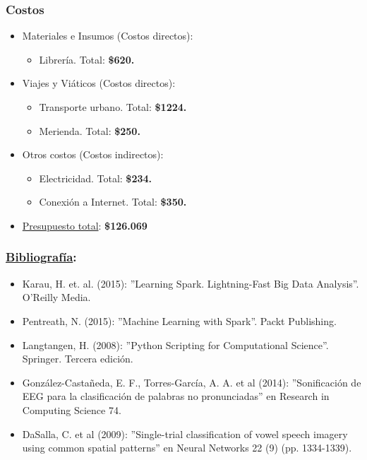 \begin{frame}[t,fragile]
	\frametitle {Costos}
	
		\begin{itemize}
			\item Materiales e Insumos (Costos directos):
			\begin{itemize}
				\item Librer\'ia. Total: \textbf{\$620.} 
			\end{itemize}
			\pause
			\item Viajes y Vi\'aticos (Costos directos): 
			\begin{itemize}
				\item Transporte urbano. Total: \textbf{\$1224.}
				\item Merienda. Total: \textbf{\$250.}
			\end{itemize}
			\pause
			\item Otros costos (Costos indirectos): 
			\begin{itemize}
				\item Electricidad. Total: \textbf{\$234.}
				\item Conexi\'on a Internet. Total: \textbf{\$350.}
			\end{itemize}
			\pause
			\item \underline{Presupuesto total}: \textbf{\color{blue}\$126.069}
		\end{itemize}
		
	
\end{frame}
	
\begin{frame}
	\frametitle{\underline{Bibliograf\'ia}:}
	\begin{itemize}
		\item Karau, H. et. al. (2015): ''Learning Spark. Lightning-Fast Big Data Analysis''. O'Reilly Media.\\
		\item Pentreath, N. (2015): ''Machine Learning with Spark''. Packt Publishing.\\
		\item Langtangen, H. (2008): ''Python Scripting for Computational Science''. Springer. Tercera edici\'on.\\
		\item Gonz\'alez-Casta\~neda, E. F., Torres-Garc\'ia, A. A. et al (2014): ''Sonificaci\'on de EEG para la clasificaci\'on de palabras no pronunciadas'' en Research in Computing Science 74. \\
		\item DaSalla, C. et al (2009): ''Single-trial classification of vowel speech imagery using common spatial patterns'' en Neural Networks 22 (9) (pp. 1334-1339).\\
	
		
	\end{itemize}	
\end{frame}

